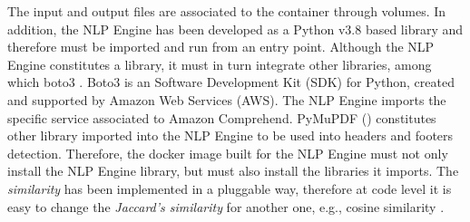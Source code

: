 The input and output files are associated to the container through volumes. In addition, the NLP Engine has been developed as a Python v3.8 based library and therefore must be imported and run from an entry point. Although the NLP Engine constitutes a library, it must in turn integrate other libraries, among which boto3 \cite{boto3}. Boto3 is an Software Development Kit (SDK) for Python, created and supported by Amazon Web Services (AWS). The NLP Engine imports the specific service associated to Amazon Comprehend. PyMuPDF (\cite{PyMuPDF}) constitutes other library imported into the NLP Engine to be used into headers and footers detection. Therefore, the docker image built for the NLP Engine must not only install the NLP Engine library, but must also install the libraries it imports. The \textit{similarity} has been implemented in a pluggable way, therefore at code level it is easy to change the \textit{Jaccard's similarity} for another one, e.g., cosine similarity \cite{Gupta2018}.
